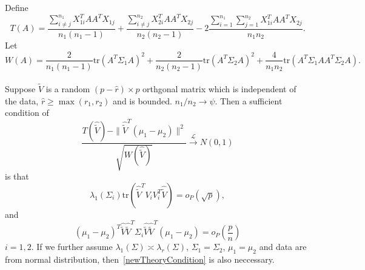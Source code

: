Define
    \begin{equation}
        T(A)=\frac{\sum_{i\neq j}^{n_1}X_{1i}^T AA^T X_{1j}}{n_1(n_1-1)}+
        \frac{\sum_{i\neq j}^{n_2}X_{2i}^T AA^T X_{2j}}{n_2(n_2-1)}-
        2\frac{\sum_{i=1}^{n_1}\sum_{j=1}^{n_2}X_{1i}^T   AA^T X_{2j}}{n_1n_2}.
    \end{equation}
    Let
    \begin{equation}
        W(A)=\frac{2}{n_1(n_1-1)}\mathrm{tr}{(A^T \Sigma_1 A)}^2+
        \frac{2}{n_2(n_2-1)}\mathrm{tr}{(A^T \Sigma_2 A)}^2+
\frac{4}{n_1 n_2}\mathrm{tr}(A^T \Sigma_1 A A^T \Sigma_2 A).
    \end{equation}

\begin{theorem}
    Suppose $\hat{\tilde{V}}$ is a random $(p-\hat{r})\times p$ orthgonal matrix which is independent of the data, $\hat{r}\geq \max(r_1,r_2)$ and is bounded. $n_1/n_2\to \psi$. Then a sufficient  condition of 
    \begin{equation}\label{newTheoryResult}
        \frac{T(\hat{\tilde{V}})-\|\hat{\tilde{V}}^T(\mu_1-\mu_2)\|^2}
        {\sqrt{W(\hat{\tilde{V}})}}
        \xrightarrow{\mathcal{L}} N(0,1)
    \end{equation}
    is that
    \begin{equation}\label{newTheoryCondition}
        \lambda_1(\Sigma_i)\mathrm{tr} (\hat{\tilde{V}}^T V_i V_i^T \hat{\tilde{V}})=o_P(\sqrt{p}),
    \end{equation}
    and
    \begin{equation}
        {(\mu_1-\mu_2)}^T \hat{\tilde{V}}\hat{\tilde{V}}^T \Sigma_i \hat{\tilde{V}}\hat{\tilde{V}}^T (\mu_1-\mu_2)=o_P(\frac{p}{n})
    \end{equation}
    $i=1,2$.
    If we further assume $\lambda_1(\Sigma)\asymp \lambda_r(\Sigma)$, $\Sigma_1=\Sigma_2$, $\mu_1=\mu_2$ and data are from normal distribution, then~\eqref{newTheoryCondition} is also neccessary.
\end{theorem}
